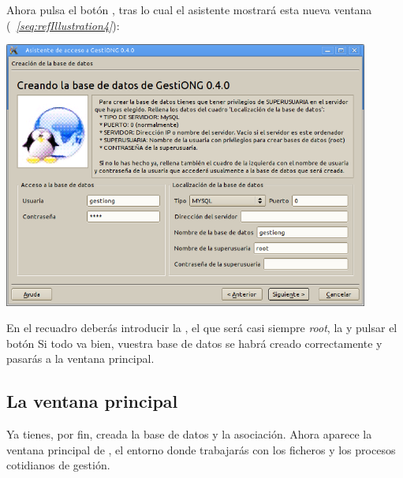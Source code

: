 \bigskip

Ahora pulsa el botón ,
tras lo cual el asistente mostrará esta nueva ventana
(\textit{\figurename~\ref{seq:refIllustration4}}):

\begin{center}
\includegraphics[width=12cm]{creandolabasededatos.png}
\label{seq:refIllustration4}

\end{center}
En el recuadro 
deberás introducir la , el  que será casi siempre
{\textquotesingle}\textit{root}{\textquotesingle}, la
 y pulsar el
botón  Si todo va bien,
vuestra base de datos se habrá creado correctamente y pasarás a la ventana principal. 


\subsection{La ventana principal}
Ya tienes, por fin, creada la base de datos y la asociación. Ahora
aparece la ventana principal de \appname, el entorno donde trabajarás
con los ficheros y los procesos cotidianos de gestión.
